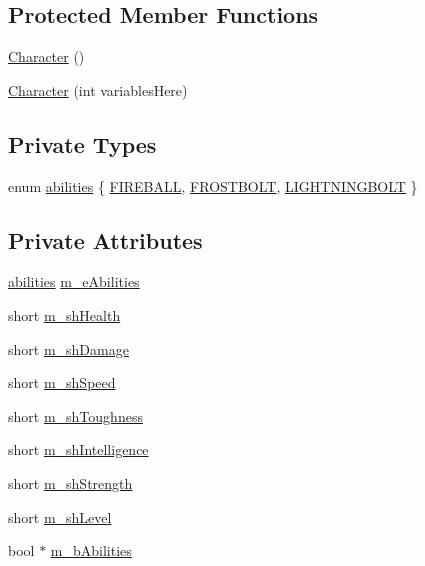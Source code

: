 \subsection*{Protected Member Functions}
\begin{DoxyCompactItemize}
\item 
\hyperlink{class_character_adc27bdd255876169bad2ed0bae0cffb5}{Character} ()
\item 
\hyperlink{class_character_a08203d27a9066d6e658eb78940b5bb06}{Character} (int variables\-Here)
\end{DoxyCompactItemize}
\subsection*{Private Types}
\begin{DoxyCompactItemize}
\item 
enum \hyperlink{class_character_ab6fbd7c75b53c7bcd4701cafb8715ba1}{abilities} \{ \hyperlink{class_character_ab6fbd7c75b53c7bcd4701cafb8715ba1aa244fdde78c2cb6d1db99a93597d2492}{F\-I\-R\-E\-B\-A\-L\-L}, 
\hyperlink{class_character_ab6fbd7c75b53c7bcd4701cafb8715ba1aa6de6b6a3e7651a31fde58c82b6baaa2}{F\-R\-O\-S\-T\-B\-O\-L\-T}, 
\hyperlink{class_character_ab6fbd7c75b53c7bcd4701cafb8715ba1a194cb46b225b19308b6859bebb69e265}{L\-I\-G\-H\-T\-N\-I\-N\-G\-B\-O\-L\-T}
 \}
\end{DoxyCompactItemize}
\subsection*{Private Attributes}
\begin{DoxyCompactItemize}
\item 
\hyperlink{class_character_ab6fbd7c75b53c7bcd4701cafb8715ba1}{abilities} \hyperlink{class_character_a8ce5038804317cc41b3672b2f77aee77}{m\-\_\-e\-Abilities}
\item 
short \hyperlink{class_character_a50138cd901b1f729a01e5e018bf63256}{m\-\_\-sh\-Health}
\item 
short \hyperlink{class_character_a504b1237f1321ae15abe0f359295a0d7}{m\-\_\-sh\-Damage}
\item 
short \hyperlink{class_character_abb0c7e556292b3d93d52e9c9f9db6258}{m\-\_\-sh\-Speed}
\item 
short \hyperlink{class_character_adaaccd5040167071f5aa3281cade4c19}{m\-\_\-sh\-Toughness}
\item 
short \hyperlink{class_character_a2319f838d38029537e1e5c6e24c24ebb}{m\-\_\-sh\-Intelligence}
\item 
short \hyperlink{class_character_a500cced8623c4cca096e0555795b6025}{m\-\_\-sh\-Strength}
\item 
short \hyperlink{class_character_afd011d8f32a2f60e3ef604a191d3ebf4}{m\-\_\-sh\-Level}
\item 
bool $\ast$ \hyperlink{class_character_a9251eb7762d3ae204f3034bfb5e83476}{m\-\_\-b\-Abilities}
\end{DoxyCompactItemize}


